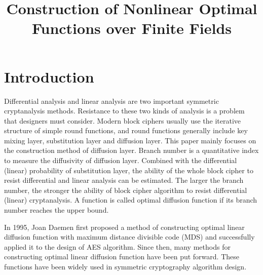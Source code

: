 \documentclass[12pt,a4paper]{article}
\newcommand{\0}{\textbf{0}}
\newcommand{\1}{\textbf{1}}
\begin{document}
\pagestyle{plain}
\title{Construction of Nonlinear Optimal Functions over Finite Fields}

\maketitle
\section{Introduction}

    Differential analysis and linear analysis are two important symmetric cryptanalysis methods. Resistance to these two kinds of analysis is a problem that designers must consider. Modern block ciphers usually use the iterative structure of simple round functions, and round functions generally include key mixing layer, substitution layer and diffusion layer. This paper mainly focuses on the construction method of diffusion layer. Branch number is a quantitative index to measure the diffusivity of diffusion layer. Combined with the differential (linear) probability of substitution layer, the ability of the whole block cipher to resist differential and linear analysis can be estimated. The larger the branch number, the stronger the ability of block cipher algorithm to resist differential (linear) cryptanalysis. A function is called optimal diffusion function if its branch number reaches the upper bound.

    In 1995, Joan Daemen first proposed a method of constructing optimal linear diffusion function with maximum distance divisible code (MDS)\cite{daemen1995cipher} and successfully applied it to the design of AES algorithm. Since then, many methods for constructing optimal linear diffusion function\cite{youssef1997design,wu2012recursive,sajadieh2015efficient,li2019lightweight} have been put forward. These functions have been widely used in symmetric cryptography algorithm design.
\end{document}
